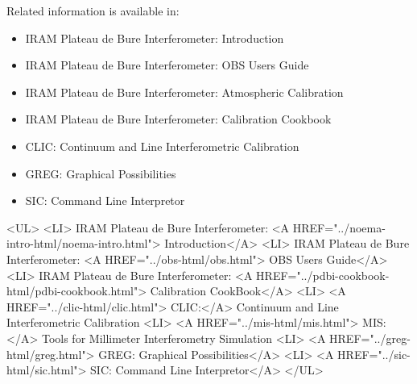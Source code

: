 \documentclass[11pt]{article}
\begin{document}
Related information is available in:
\begin{latexonly}
  \begin{itemize}
  \item{IRAM Plateau de Bure Interferometer: Introduction}
  \item{IRAM Plateau de Bure Interferometer: OBS Users Guide}
  \item{IRAM Plateau de Bure Interferometer: Atmospheric Calibration}
  \item{IRAM Plateau de Bure Interferometer: Calibration Cookbook}
  \item{CLIC: Continuum and Line Interferometric Calibration}
  \item{GREG: Graphical Possibilities}
  \item{SIC:  Command Line Interpretor}
  \end{itemize}
\end{latexonly}
%
\begin{rawhtml}
  <UL>
  <LI> IRAM Plateau de Bure Interferometer: <A HREF="../noema-intro-html/noema-intro.html">
  Introduction</A>
  <LI> IRAM Plateau de Bure Interferometer: <A HREF="../obs-html/obs.html"> 
  OBS Users Guide</A>
  <LI> IRAM Plateau de Bure Interferometer: <A HREF="../pdbi-cookbook-html/pdbi-cookbook.html"> 
  Calibration CookBook</A>
  <LI> <A HREF="../clic-html/clic.html"> CLIC:</A>  
  Continuum and Line Interferometric Calibration 
  <LI> <A HREF="../mis-html/mis.html"> MIS:</A>
  Tools for Millimeter Interferometry Simulation
  <LI> <A HREF="../greg-html/greg.html"> GREG: Graphical Possibilities</A>
  <LI> <A HREF="../sic-html/sic.html">   SIC:  Command Line Interpretor</A>
  </UL>
\end{rawhtml}

\newpage
\tableofcontents{} %


\newpage


\newpage


\newpage


\newpage


\newpage


\newpage


\clearpage
\newpage


\clearpage
\newpage

\end{document}
